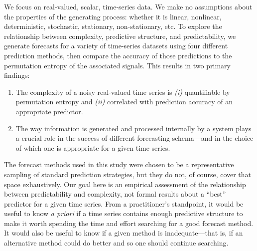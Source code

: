 We focus on real-valued, scalar, time-series data.
% 
% 
We make no assumptions about the properties of the generating process:
whether it is linear, nonlinear, deterministic, stochastic,
stationary, non-stationary, etc.  To explore the relationship between
complexity, predictive structure, and predictability, we generate
forecasts for a variety of time-series datasets using four different
prediction methods, then compare the accuracy of those predictions to
the permutation entropy of the associated signals.  This results in
two primary findings:
\begin{enumerate}
\item The complexity of a noisy real-valued time series is \emph{(i)}
  quantifiable by permutation entropy and \emph{(ii)} correlated with
  prediction accuracy of an appropriate predictor.
\item The way information is generated and processed internally by a
  system plays a crucial role in the success of different forecasting
  schema---and in the choice of which one is appropriate for a given 
time series.
\end{enumerate}
The forecast methods used in this study were chosen to be a
representative sampling of standard prediction strategies, but they do
not, of course, cover that space exhaustively.  Our goal here is an
empirical assessment of the relationship between predictability and
complexity, not formal results about a ``best'' predictor for a given
time series.  From a practitioner's standpoint, it would be useful to
know \emph{ a priori} if a time series contains enough predictive
structure to make it worth spending the time and effort searching for
a good forecast method.  It would also be useful to know if a given
method is inadequate---that is, if an alternative method could do
better and so one should continue searching.


